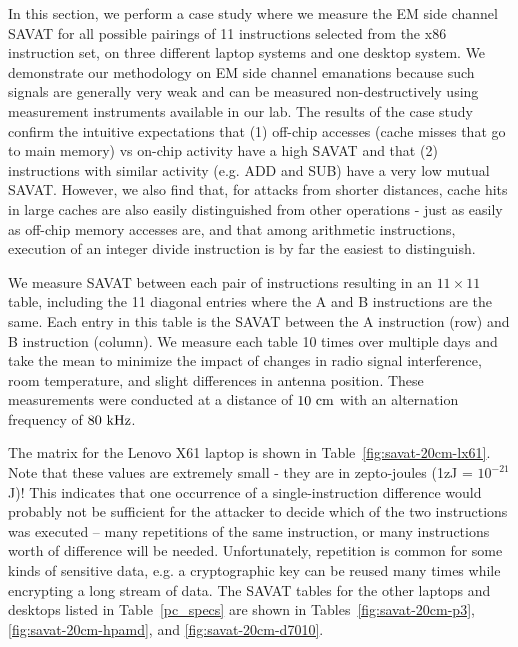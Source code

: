 
In this section, we perform a case study where we measure the EM side channel SAVAT for all possible pairings of 11 instructions selected from the x86 instruction set, on three different laptop systems and one desktop system. We demonstrate our methodology on EM side channel emanations because such signals are generally very weak and can be measured non-destructively using measurement instruments available in our lab. The results of the case study confirm the intuitive expectations that (1) off-chip accesses (cache misses that go to main memory) vs on-chip activity have a high SAVAT  and that (2) instructions with similar activity (e.g. ADD and SUB) have a very low mutual SAVAT. However, we also find that, for attacks from shorter distances, cache hits in large caches are also easily distinguished from other operations - just as easily as off-chip memory accesses are, and that among arithmetic instructions, execution of an integer divide instruction is by far the easiest to distinguish.

We measure SAVAT between each pair of instructions resulting in an $11 \times 11$ table, including the 11 diagonal entries where the A and B instructions are the same. Each entry in this table is the SAVAT between the A instruction (row) and B instruction (column). We measure each table 10 times over multiple days and take the mean to minimize the impact of changes in radio signal interference, room temperature, and slight differences in antenna position. These measurements were conducted at a distance of $10~{\rm cm}$ with an alternation frequency of $80~{\rm kHz}$.

The matrix for the Lenovo X61 laptop is shown in Table~\ref{fig:savat-20cm-lx61}. Note that these values are extremely small - they are in zepto-joules (1zJ = $10^{-21}$J)! This indicates that one occurrence of a single-instruction difference would probably not be sufficient for the attacker to decide which of the two instructions was executed -- many repetitions of the same instruction, or many instructions worth of difference will be needed. Unfortunately, repetition is common for some kinds of sensitive data, e.g. a cryptographic key can be reused many times while encrypting a long stream of data.
The SAVAT tables for the other laptops and desktops listed in Table~\ref{pc_specs} are shown in Tables~\ref{fig:savat-20cm-p3}, \ref{fig:savat-20cm-hpamd}, and \ref{fig:savat-20cm-d7010}. 

